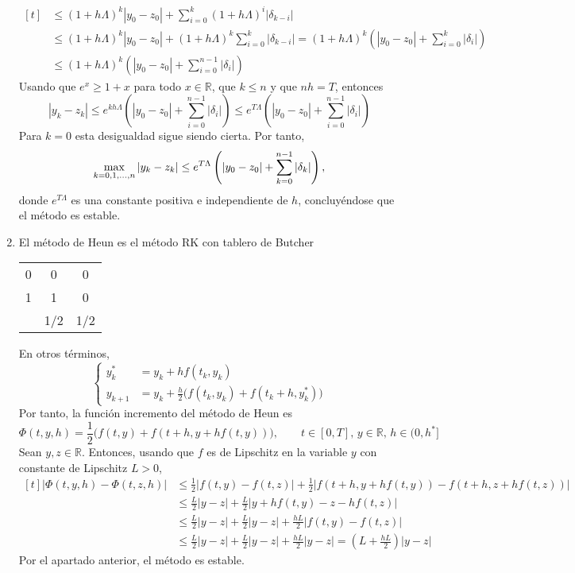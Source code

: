 \documentclass[11pt]{report}
\newcommand{\R}{\mathbb R}
\begin{document}
\begin{enumerate}
\[\begin{aligned}[t]
        &\leq (1+h\Lambda)^k |y_0-z_0|+\sum_{i=0}^k (1+h\Lambda)^i |\delta_{k-i}| \\
        &\leq (1+h\Lambda)^k |y_0-z_0|+(1+h\Lambda)^k\sum_{i=0}^k  |\delta_{k-i}| = (1+h\Lambda)^k\left(|y_0-z_0| +\sum_{i=0}^k |\delta_i|\right) \\
        &\leq  (1+h\Lambda)^k\left(|y_0-z_0| +\sum_{i=0}^{n-1} |\delta_i|\right)
    \end{aligned} \]
    Usando que $e^x \geq 1+x$ para todo $x \in \R$, que $k \leq n$ y que $nh = T$, entonces
    \[|y_k-z_k| \leq e^{kh\Lambda}\left(|y_0-z_0| +\sum_{i=0}^{n-1} |\delta_i|\right) \leq e^{T\Lambda}\left(|y_0-z_0| +\sum_{i=0}^{n-1} |\delta_i|\right)\]
    Para $k = 0$ esta desigualdad sigue siendo cierta. Por tanto,
    \[\max_{k=0,1,\mathellipsis,n} |y_k-z_k| \leq e^{T\Lambda}\left(|y_0-z_0|+\sum_{k=0}^{n-1} |\delta_k|\right),\]
    donde $e^{T\Lambda}$ es una constante positiva e independiente de $h$, concluyéndose que el método es estable.
    \item El método de Heun es el método RK con tablero de Butcher
    
\begin{center}
    \setlength\extrarowheight{2.5pt}
    \begin{tabular}{c|cc}
        0 & 0 & 0 \\
        1 & 1  & 0 \\ \hline
        & 1/2 & 1/2
    \end{tabular}
\end{center}

En otros términos,
\[\left\{\begin{alignedat}{1}
    y_k^{*} &= y_k+hf(t_k,y_k) \\
    y_{k+1} &= y_k+\frac{h}{2}\bigl(f(t_k,y_k)+f(t_k+h,y_k^*)\bigr)
\end{alignedat}\right.\]
Por tanto, la función incremento del método de Heun es 
\[\Phi(t,y,h) = \frac{1}{2}\bigl(f(t,y)+f(t+h,y+hf(t,y))\bigr), \qquad t \in [0,T], \, y \in \R, \, h \in (0,h^*]\]
Sean $y,z \in \R$. Entonces, usando que $f$ es de Lipschitz en la variable $y$ con constante de Lipschitz $L>0$,
\[
\begin{aligned}[t]
|\Phi(t,y,h)-\Phi(t,z,h)| &\leq \frac{1}{2}|f(t,y)-f(t,z)|+\frac{1}{2}|f(t+h,y+hf(t,y))-f(t+h,z+hf(t,z))| \\
&\leq \frac{L}{2}|y-z|+\frac{L}{2}|y+hf(t,y)-z-hf(t,z)| \\
&\leq\frac{L}{2}|y-z|+\frac{L}{2}|y-z|+\frac{hL}{2}|f(t,y)-f(t,z)| \\
&\leq\frac{L}{2}|y-z|+\frac{L}{2}|y-z|+\frac{hL}{2}|y-z| = \left(L+\frac{hL}{2}\right)|y-z|
\end{aligned}
\]
Por el apartado anterior, el método es estable.

\end{enumerate}
\end{document}
